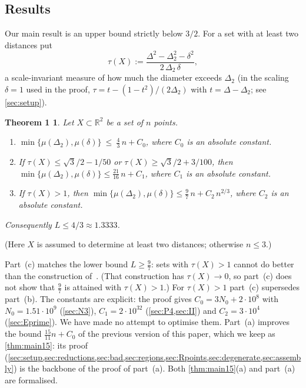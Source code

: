 \documentclass[11pt]{amsart}
\newtheorem*{mainthm}{Theorem 1}
\theoremstyle{definition}
\theoremstyle{remark}
\newcommand{\R}{\mathbb{R}}
\newcommand{\Dt}{\Delta_2}
\newcommand{\mult}{\mu}
\begin{document}
\subsection*{Results}
Our main result is an upper bound strictly below $3/2$. For a set with at least two distances put
\[
\tau(X):=\frac{\Delta^2-\Dt^2-\delta^2}{2\,\Dt\,\delta},
\]
a scale-invariant measure of how much the diameter exceeds $\Dt$ (in the scaling $\delta=1$ used in the proof, $\tau=t-(1-t^2)/(2\Dt)$ with $t=\Delta-\Dt$; see \cref{sec:setup}).

\begin{mainthm}
Let $X\subset\R^2$ be a set of $n$ points.
\begin{enumerate}[label=\textup{(\alph*)}]
\item $\min\{\mult(\Dt),\mult(\delta)\}\ \le\ \tfrac43\,n+C_0$, where $C_0$ is an absolute constant.
\item If $\tau(X)\le\sqrt3/2-1/50$ or $\tau(X)\ge\sqrt3/2+3/100$, then $\min\{\mult(\Dt),\mult(\delta)\}\le\tfrac{21}{16}\,n+C_1$, where $C_1$ is an absolute constant.
\item If $\tau(X)>1$, then $\min\{\mult(\Dt),\mult(\delta)\}\le\tfrac97\,n+C_2\,n^{2/3}$, where $C_2$ is an absolute constant.
\end{enumerate}
Consequently $L\le 4/3\approx 1.3333$.
\end{mainthm}
(Here $X$ is assumed to determine at least two distances; otherwise $n\le3$.)

Part~(c) matches the lower bound $L\ge\frac97$: sets with $\tau(X)>1$ cannot do better than the construction of~\cite{ienjoymath}. (That construction has $\tau(X)\to0$, so part~(c) does not show that $\frac97$ is attained with $\tau(X)>1$.) For $\tau(X)>1$ part~(c) supersedes part~(b). The constants are explicit: the proof gives $C_0=3N_0+2\cdot10^8$ with $N_0=1.51\cdot 10^9$ (\cref{sec:N3}), $C_1=2\cdot10^{32}$ (\cref{sec:P4,sec:II}) and $C_2=3\cdot10^4$ (\cref{sec:Eprime}). We have made no attempt to optimise them. Part~(a) improves the bound $\frac{15}{11}n+C_0$ of the previous version of this paper, which we keep as \cref{thm:main15}: its proof (\cref{sec:setup,sec:reductions,sec:bad,sec:regions,sec:Rpoints,sec:degenerate,sec:assembly}) is the backbone of the proof of part~(a). Both \cref{thm:main15}(a) and part~(a) are formalised.
\end{document}
